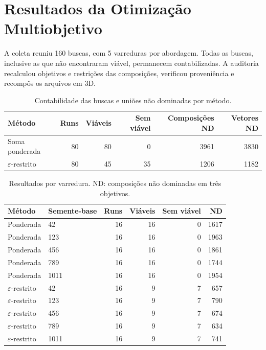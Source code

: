 \documentclass[12pt,a4paper]{article}
\begin{document}
\section{Resultados da Otimização Multiobjetivo}
\label{sec:resultados_tp2}
A coleta reuniu 160 buscas, com 5 varreduras por abordagem. Todas as buscas, inclusive as que não encontraram viável, permanecem contabilizadas. A auditoria recalculou objetivos e restrições das composições, verificou proveniência e recompôs os arquivos em 3D.
\begin{table}[H]\centering\small
\caption{Contabilidade das buscas e uniões não dominadas por método.}
\label{tab:tp2_metodos}
\begin{tabular}{lrrrrr}\toprule
Método & Runs & Viáveis & Sem viável & Composições ND & Vetores ND \\ \midrule
Soma ponderada & 80 & 80 & 0 & 3961 & 3830 \\
$\varepsilon$-restrito & 80 & 45 & 35 & 1206 & 1182 \\
\bottomrule\end{tabular}\end{table}

\begin{table}[H]\centering
\caption{Resultados por varredura. ND: composições não dominadas em três objetivos.}
\label{tab:tp2_repeticoes}
\begin{tabular}{llrrrr}\toprule
Método & Semente-base & Runs & Viáveis & Sem viável & ND \\ \midrule
Ponderada & 42 & 16 & 16 & 0 & 1617 \\
Ponderada & 123 & 16 & 16 & 0 & 1963 \\
Ponderada & 456 & 16 & 16 & 0 & 1861 \\
Ponderada & 789 & 16 & 16 & 0 & 1744 \\
Ponderada & 1011 & 16 & 16 & 0 & 1954 \\
$\varepsilon$-restrito & 42 & 16 & 9 & 7 & 657 \\
$\varepsilon$-restrito & 123 & 16 & 9 & 7 & 790 \\
$\varepsilon$-restrito & 456 & 16 & 9 & 7 & 674 \\
$\varepsilon$-restrito & 789 & 16 & 9 & 7 & 634 \\
$\varepsilon$-restrito & 1011 & 16 & 9 & 7 & 741 \\
\bottomrule\end{tabular}
\end{table}
\end{document}
